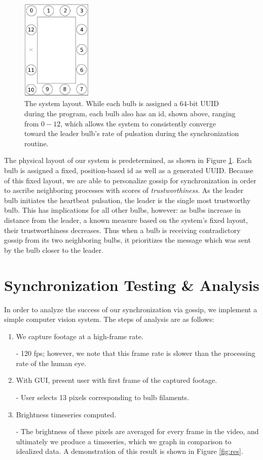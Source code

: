 \documentclass[preprint,review,12pt]{cs262}
\begin{document}
\begin{figure}[h]
  \centering
  \includegraphics[width=0.3\textwidth]{figures/system_layout}
  \caption{The system layout. While each bulb is assigned a 64-bit UUID during the program, each bulb also has an id, shown above, ranging from $0-12$, which allows the system to consistently converge toward the leader bulb's rate of pulsation during the synchronization routine. 
 \label{fig:layout}}
\end{figure}

The physical layout of our system is predetermined, as shown in Figure \ref{fig:layout}. Each bulb is assigned a fixed, position-based id as well as a generated UUID. Because of this fixed layout, we are able to personalize gossip for synchronization in order to ascribe neighboring processes with scores of \emph{trustworthiness}. As the leader bulb initiates the heartbeat pulsation, the leader is the single most trustworthy bulb. This has implications for all other bulbs, however: as bulbs increase in distance from the leader, a known measure based on the system's fixed layout, their trustworthiness decreases. Thus when a bulb is receiving contradictory gossip from its two neighboring bulbs, it prioritizes the message which was sent by the bulb closer to the leader.  

\section{Synchronization Testing \& Analysis}

In order to analyze the success of our synchronization via gossip, we implement a simple computer vision system. The steps of analysis are as follows: 

\begin{enumerate} 
\item We capture footage at a high-frame rate. 

- 120 fps; however, we note that this frame rate is slower than the processing rate of the human eye. 

\item With GUI, present user with first frame of the captured footage. 

- User selects 13 pixels corresponding to bulb filaments. 

\item Brightness timeseries computed. 

- The brightness of these pixels are averaged for every frame in the video, and ultimately we produce a timeseries, which we graph in comparison to idealized data. A demonstration of this result is shown in Figure \ref{fig:res}. 
\end{enumerate}
\end{document}
